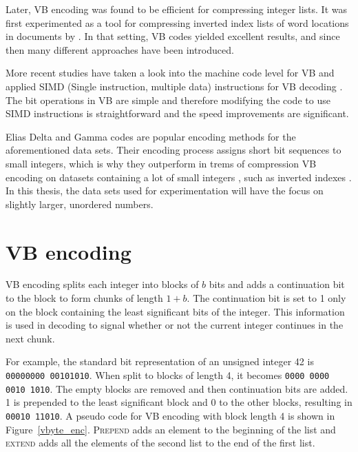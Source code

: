 Later, VB encoding was found to be efficient for compressing integer lists. It was first experimented as a tool for compressing inverted index lists of word locations in documents by \citep{Sch02}. 
In that setting, VB codes yielded excellent results, and since then many different approaches have been introduced. 

More recent studies have taken a look into the machine code level for VB and applied SIMD (Single instruction, multiple data) instructions for VB decoding \citep{Lem18,Pla15}. The bit 
operations in VB are simple and therefore modifying the code to use SIMD instructions is straightforward and the speed improvements are significant. 

Elias Delta and Gamma codes \citep{Eli75} are popular encoding methods for the aforementioned data sets. Their encoding process assigns short bit sequences to small integers, 
which is why they outperform in trems of compression VB encoding on datasets containing a lot of small integers \citep{Wil99}, such as inverted indexes \citep{Anh05, Pib19}. In this thesis, 
the data sets used for experimentation will have the focus on slightly larger, unordered numbers.

\section{VB encoding}
VB encoding splits each integer into blocks of $b$ bits and adds a continuation bit to the block to form chunks of length $1+b$. The continuation bit is set to 1 only
on the block containing the least significant bits of the integer. This information is used in decoding to signal whether or not the current integer continues in the next chunk. 

For example, the standard bit representation of an unsigned integer 42 is \texttt{00000000 00101010}. When split to blocks of length 4, it becomes \texttt{0000 0000 0010 1010}. The empty blocks 
are removed and then continuation bits are added. 1 is prepended to the least significant block and 0 to the other blocks, resulting in \texttt{00010 11010}. A pseudo code for VB encoding with 
block length 4 is shown in Figure~\ref{vbyte_enc}. \textsc{Prepend} adds an element to the beginning of the list 
and \textsc{extend} adds all the elements of the second list to the end of the first list.

